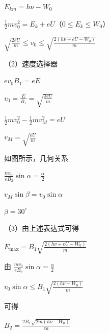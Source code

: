 \documentclass[\gkver]{gaokaozhenti}
\begin{document}
\begin{enumerate}
{	$E_{km}=h\nu-W_{0}$

	$\frac{1}{2}mv_{0}^{2}=E_{k}+eU$（$0\leq E_{k}\leq W_{0}$）

	$\sqrt{\frac{2eU}{m}}\leq v_{0}\leq\sqrt{\frac{2(h\nu+eU-W_{0})}{m}}$

	（2）速度选择器

	$ev_{0}B_{1}=eE$

	$v_{0}=\frac{E}{B_{1}}=\sqrt{\frac{3eU}{m}}$

	$\frac{1}{2}mv_{0}^{2}-\frac{1}{2}mv_{M}^{2}=eU$

	$v_{M}=\sqrt{\frac{eU}{m}}$

	如图所示，几何关系


	$\frac{mv_{0}}{eB_{2}}\sin\alpha=\frac{\alpha}{2}$

	$v_{M}\sin\beta=v_{0}\sin\alpha$

	$\beta=30^{\circ}$

	（3）由上述表达式可得

	$E_{\max}=B_{1}\sqrt{\frac{2(h\nu+eU-W_{0})}{m}}$

	由 $\frac{mv_{0}}{eB_{2}}\sin\alpha=\frac{\alpha}{2}$

	$v_{0}\sin\alpha\leq B_{1}\sqrt{\frac{2(h\nu-W_{0})}{m}}$

	可得

	$B_{2}=\frac{2B_{1}\sqrt{2m(h\nu-W_{0})}}{ea}$
}

\end{enumerate}
\end{document}
